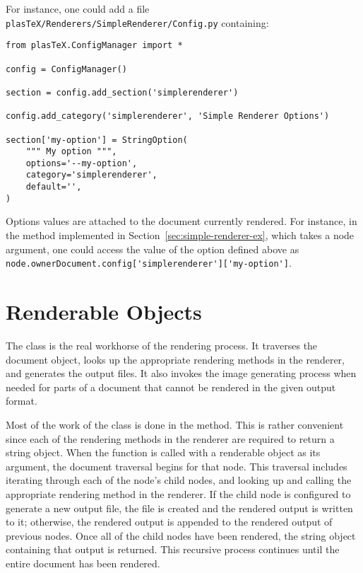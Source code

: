 For instance, one could add a file
\verb+plasTeX/Renderers/SimpleRenderer/Config.py+ containing:

\begin{verbatim}
from plasTeX.ConfigManager import *

config = ConfigManager()

section = config.add_section('simplerenderer')

config.add_category('simplerenderer', 'Simple Renderer Options')

section['my-option'] = StringOption(
    """ My option """,
    options='--my-option',
    category='simplerenderer',
    default='',
)
\end{verbatim}

Options values are attached to the document currently rendered. For
instance, in the  method implemented in
Section~\ref{sec:simple-renderer-ex}, which takes a node argument, one
could access the value of the option defined above as
\verb+node.ownerDocument.config['simplerenderer']['my-option']+.


\section{Renderable Objects\label{sec:renderable}}

The  class is the real workhorse of the rendering process.
It traverses the document object, looks up the appropriate rendering
methods in the renderer, and generates the output files.  It also
invokes the image generating process when needed for parts of a document
that cannot be rendered in the given output format.

Most of the work of the  class is done in the
 method.  This is rather convenient since each of
the rendering methods in the renderer are required to return a string
object.  When the  function is called with a renderable
object as its argument, the document traversal begins for that node.
This traversal includes iterating through each of the node's child nodes, and
looking up and calling the appropriate rendering method in the renderer.
If the child node is configured to generate a new output file, the
file is created and the rendered output is written to it; otherwise,
the rendered output is appended to the rendered output of previous nodes.
Once all of the child nodes have been rendered, the string object containing
that output is returned.  This recursive process continues until the
entire document has been rendered.

